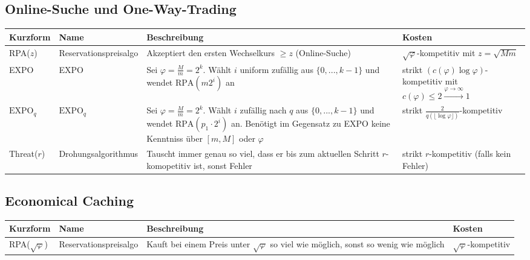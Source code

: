 \subsection{Online-Suche und One-Way-Trading}
\begin{tabularx}{\textwidth}{|l|l|X|X|} \hline
Kurzform & Name & Beschreibung & Kosten\\ \hline \hline
RPA($z$) & Reservationspreisalgo & Akzeptiert den ersten Wechselkurs $\geq z$ (Online-Suche) & $\sqrt{\varphi}$-kompetitiv mit $z=\sqrt{Mm}$ \\ \hline
EXPO & EXPO & Sei $\varphi = \frac{M}{m} = 2^k$. Wählt $i$ uniform zufällig aus $\{0,...,k-1\}$ und wendet $\textrm{RPA}(m2^i)$ an & strikt $(c(\varphi)\log\varphi)$-kompetitiv mit $c(\varphi) \leq 2 \xrightarrow{\varphi \rightarrow \infty} 1$ \\ \hline
$\textrm{EXPO}_q$ & $\textrm{EXPO}_q$ & Sei $\varphi = \frac{M}{m} = 2^k$. Wählt $i$ zufällig nach $q$ aus $\{0,...,k-1\}$ und wendet $\textrm{RPA}(p_1\cdot2^i)$ an. Benötigt im Gegensatz zu EXPO keine Kenntniss über $[m,M]$ oder $\varphi$ & strikt $\frac{2}{q(\lfloor\log\varphi\rfloor)}$-kompetitiv \\ \hline
Threat($r$) & Drohungsalgorithmus & Tauscht immer genau so viel, dass er bis zum aktuellen Schritt $r$-komopetitiv ist, sonst Fehler & strikt $r$-kompetitiv (falls kein Fehler) \\ \hline
\end{tabularx}

\subsection{Economical Caching}
\begin{tabularx}{\textwidth}{|l|l|X|X|} \hline
Kurzform & Name & Beschreibung & Kosten\\ \hline \hline
RPA($\sqrt{\varphi}$) & Reservationspreisalgo & Kauft bei einem Preis unter $\sqrt{\varphi}$ so viel wie möglich, sonst so wenig wie möglich & $\sqrt{\varphi}$-kompetitiv \\ \hline
\end{tabularx}
